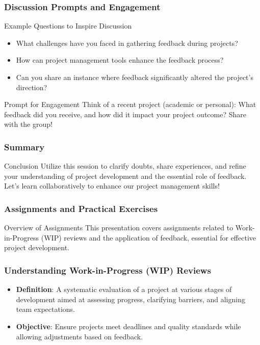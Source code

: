 \documentclass[aspectratio=169]{beamer}
\begin{document}
\begin{frame}[fragile]
    \frametitle{Discussion Prompts and Engagement}
    \begin{block}{Example Questions to Inspire Discussion}
        \begin{itemize}
            \item What challenges have you faced in gathering feedback during projects?
            \item How can project management tools enhance the feedback process?
            \item Can you share an instance where feedback significantly altered the project's direction?
        \end{itemize}
    \end{block}

    \begin{block}{Prompt for Engagement}
        Think of a recent project (academic or personal): What feedback did you receive, and how did it impact your project outcome? Share with the group!
    \end{block}
\end{frame}

\begin{frame}[fragile]
    \frametitle{Summary}
    \begin{block}{Conclusion}
        Utilize this session to clarify doubts, share experiences, and refine your understanding of project development and the essential role of feedback. 
        Let’s learn collaboratively to enhance our project management skills!
    \end{block}
\end{frame}

\begin{frame}[fragile]
    \frametitle{Assignments and Practical Exercises}
    \begin{block}{Overview of Assignments}
        This presentation covers assignments related to Work-in-Progress (WIP) reviews and the application of feedback, essential for effective project development.
    \end{block}
\end{frame}

\begin{frame}[fragile]
    \frametitle{Understanding Work-in-Progress (WIP) Reviews}
    \begin{itemize}
        \item \textbf{Definition}: A systematic evaluation of a project at various stages of development aimed at assessing progress, clarifying barriers, and aligning team expectations.
        \item \textbf{Objective}: Ensure projects meet deadlines and quality standards while allowing adjustments based on feedback.
    \end{itemize}
\end{frame}
\end{document}
